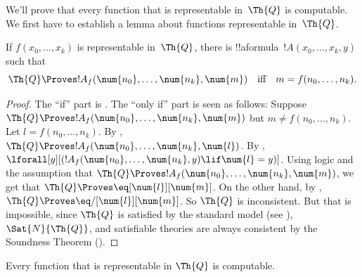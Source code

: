 \documentclass[../../../include/open-logic-section]{subfiles}
\begin{document}

We'll prove that every function that is representable in~$\Th{Q}$ is
computable. We first have to establish a lemma about functions
representable in~$\Th{Q}$.

\begin{lem}
  If $f(x_0,
  \dots, x_k)$ is representable in~$\Th{Q}$, there is
  !!a{formula}~$!A(x_0, \dots, x_k, y)$ such that
  \[
  \Th{Q} \Proves !A_f(\num{n_0}, \dots, \num{n_k}, \num{m})
  \quad\text{iff}\quad m = f(n_0, \dots, n_k).
  \]
\end{lem}

\begin{proof}
  The ``if'' part is
. The ``only
if'' part is seen as follows: Suppose $\Th{Q} \Proves !A_f(\num{n_0},
\dots, \num{n_k}, \num{m})$ but $m \neq f(n_0, \dots, n_k)$. Let $l =
f(n_0, \dots, n_k)$. By
, $\Th{Q}
\Proves !A_f(\num{n_0}, \dots, \num{n_k}, \num{l})$. By
,
$\lforall[y][(!A_f(\num{n_0}, \dots, \num{n_k}, y) \lif \num{l} =
y)]$. Using logic and the assumption that $\Th{Q} \Proves
!A_f(\num{n_0}, \dots, \num{n_k}, \num{m})$, we get that $\Th{Q}
\Proves \eq[\num{l}][\num{m}]$. On the other hand, by
, $\Th{Q} \Proves
\eq/[\num{l}][\num{m}]$. So $\Th{Q}$ is inconsistent. But that is
impossible, since $\Th{Q}$ is satisfied by the standard model (see
), $\Sat{N}{\Th{Q}}$, and
satisfiable theories are always consistent by the Soundness Theorem
().
\end{proof}

\begin{lem}
Every function that is representable in $\Th{Q}$ is computable.
\end{lem}
\end{document}
